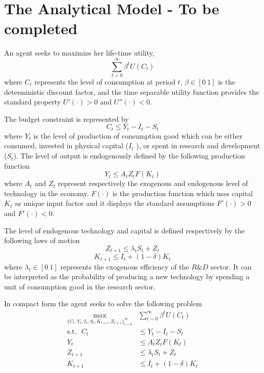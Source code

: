 \documentclass{article}
\begin{document}
	\section{The Analytical Model - To be completed}
	
	An agent seeks to maximize her life-time utility,
	\begin{equation}
	\sum_{t=0}^{\infty} \beta^t U(C_t)
	\end{equation}
	where $C_t$ represents the level of consumption at period $t$, $\beta \in [0 \ 1]$ is the deterministic discount factor, and the time separable utility function provides the standard property $U'(\cdot)>0$ and  $U''(\cdot) < 0$. 
	
	The budget constraint is represented by
	\begin{equation}
	C_t \leq Y_t - I_t - S_t
	\end{equation}
	where $Y_t$ is the level of production of consumption good which can be either consumed, invested in physical capital ($I_t$ ), or spent in research and development ($S_t$). The level of output is endogenously defined by the following production function
	\begin{equation}
	Y_t \leq A_t Z_t F(K_t)
	\end{equation}
	where $A_t$ and $Z_t$ represent respectively the exogenous and endogenous level of technology in the economy. $F(\cdot)$ is the production function which uses capital $K_t$ as unique input factor and it displays the standard assumptions $F'(\cdot) > 0$ and $F'(\cdot) < 0$.
	
	The level of endogenous technology and capital is defined respectively by the following laws of motion
	\begin{equation}
	Z_{t+1} \leq \lambda_t S_t + Z_t
	\end{equation}
	\begin{equation}
	K_{t+1} \leq I_t + (1 - \delta)K_t
	\end{equation}
	where $\lambda_t \in [0 \ 1]$ represents the exogenous efficiency of the $R\&D$ sector. It can be interpreted as the probability of producing a new technology by spending a unit of consumption good in the research sector.
	
	In compact form the agent seeks to solve the following problem
	\begin{equation}
	\begin{split}
	\max_{\{ C_t,Y_t,I_t,S_t,K_{t+1},Z_{t+1} \}_{t=0}^{\infty}} &\sum_{t=0}^{\infty} \beta^t U(C_t) \\
	\text{s.t.} \ \ \ C_t &\leq Y_t - I_t - S_t \\
	Y_t &\leq A_t Z_t F(K_t) \\
	Z_{t+1} &\leq \lambda_t S_t + Z_t \\
	K_{t+1} &\leq I_t + (1 - \delta)K_t \\
	\end{split}
	\end{equation}
	
\end{document}
